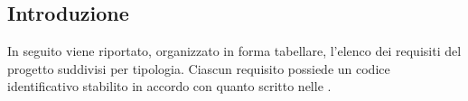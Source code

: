\newcommand{\refreqID}[2]{\ref{Req#1#2}}

\newcommand{\refreq}[1]{\stepCR\refreqID{#1}{\valueCR}}
\newcommand{\refsreq}[1]{\stepsubCR\refreqID{#1}{\valuesubCR}}

\newcommand{\refUserCase}[1]{\foreach [count=\i] \ucref in {#1}{\ifnum\i=1\hyperref[\ucref]{\ucref}\else, \hyperref[\ucref]{\ucref}\fi}}

\newcommand{\refRequisiti}[2]{\foreach [count=\i] \reqID in {#2}{\ifnum\i=1\refreqID{#1}{\reqID}\else, \refreqID{#1}{\reqID}\fi}}

\newcommand{\row}{\\ \hline}

\subsection{Introduzione}
In seguito viene riportato, organizzato in forma tabellare, l'elenco dei requisiti del progetto suddivisi per tipologia. Ciascun requisito possiede un codice identificativo stabilito in accordo con quanto scritto nelle .


